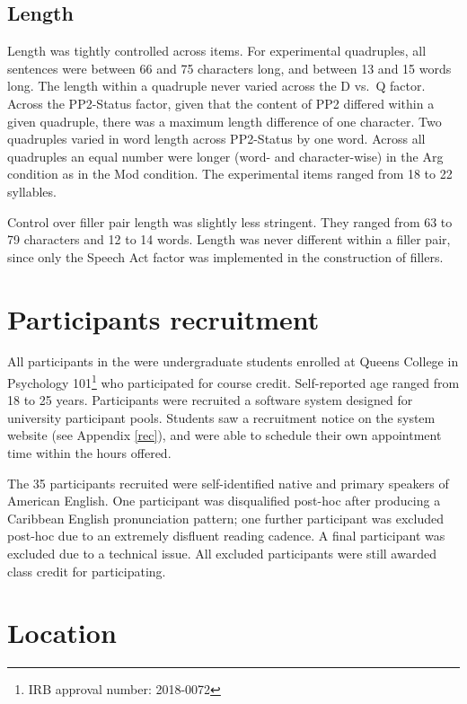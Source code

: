 \documentclass[12pt,oneside]{book}
\let\rmarkdownfootnote\footnote%
\def\footnote{\protect\rmarkdownfootnote}
\begin{document}
\hypertarget{length}{%
\subsection{Length}\label{length}}

Length was tightly controlled across items. For experimental quadruples, all sentences were between 66 and 75 characters long, and between 13 and 15 words long. The length within a quadruple never varied across the D vs.~Q factor. Across the PP2-Status factor, given that the content of PP2 differed within a given quadruple, there was a maximum length difference of one character. Two quadruples varied in word length across PP2-Status by one word. Across all quadruples an equal number were longer (word- and character-wise) in the Arg condition as in the Mod condition. The experimental items ranged from 18 to 22 syllables.

Control over filler pair length was slightly less stringent. They ranged from 63 to 79 characters and 12 to 14 words. Length was never different within a filler pair, since only the Speech Act factor was implemented in the construction of fillers.

\hypertarget{participants-recruitment}{%
\section{Participants recruitment}\label{participants-recruitment}}

All participants in the were undergraduate students enrolled at Queens College in Psychology 101\footnote{IRB approval number: 2018-0072} who participated for course credit. Self-reported age ranged from 18 to 25 years. Participants were recruited a software system designed for university participant pools. Students saw a recruitment notice on the system website (see Appendix \ref{rec}), and were able to schedule their own appointment time within the hours offered.

The 35 participants recruited were self-identified native and primary speakers of American English. One participant was disqualified post-hoc after producing a Caribbean English pronunciation pattern; one further participant was excluded post-hoc due to an extremely disfluent reading cadence. A final participant was excluded due to a technical issue. All excluded participants were still awarded class credit for participating.

\hypertarget{location}{%
\section{Location}\label{location}}
\end{document}
